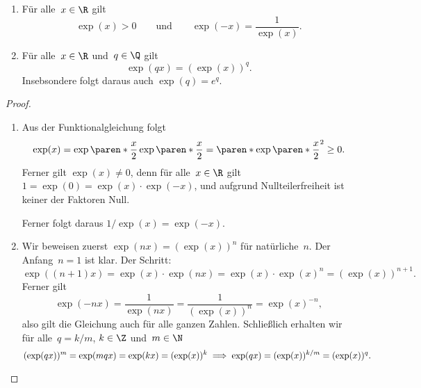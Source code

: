 \documentclass[a4paper]{article}
\begin{document}
\begin{corollary}\leavevmode
    \begin{enumerate}
        \item Für alle~$x \in \R$ gilt
              \begin{equation*}
                  \exp(x) > 0 \qquad\text{und}\qquad \exp(-x) = \frac{1}{\exp(x)}.
              \end{equation*}
        \item Für alle~$x \in \R$ und~$q \in \Q$ gilt
              \begin{equation*}
                  \exp(qx) = (\exp(x))^q.
              \end{equation*}
              Insebsondere folgt daraus auch $\exp(q) = e^q$.
    \end{enumerate}
\end{corollary}

\begin{proof}\leavevmode
    \begin{enumerate}
        \item Aus der Funktionalgleichung folgt
              \begin{equation*}
                  \exp(x) = \exp\paren*{\frac{x}{2}} \exp\paren*{\frac{x}{2}} = \paren*{\exp\paren*{\frac{x}{2}}}^2 \geq 0.
              \end{equation*}
              Ferner gilt $\exp(x) \neq 0$, denn für alle~$x \in \R$ gilt $1 = \exp(0) = \exp(x) \cdot \exp(-x)$, und aufgrund Nullteilerfreiheit ist keiner der Faktoren Null.

              Ferner folgt daraus $1/\exp(x) = \exp(-x)$.
        \item Wir beweisen zuerst $\exp(nx) = (\exp(x))^n$ für natürliche~$n$. Der Anfang~$n = 1$ ist klar. Der Schritt:
              \begin{equation*}
                  \exp((n+1)x) = \exp(x) \cdot \exp(nx) = \exp(x) \cdot \exp(x)^n = (\exp(x))^{n+1}.
              \end{equation*}
              Ferner gilt
              \begin{equation*}
                  \exp(-nx) = \frac{1}{\exp(nx)} = \frac{1}{(\exp(x))^n} = \exp(x)^{-n},
              \end{equation*}
              also gilt die Gleichung auch für alle ganzen Zahlen. Schließlich erhalten wir für alle~$q = k/m$, $k \in \Z$ und~$m \in \N$
              \begin{equation*}
                  (\exp(qx))^m = \exp(mqx) = \exp(kx) = (\exp(x))^k \implies \exp(qx) = (\exp(x))^{k/m} = (\exp(x))^q. \qedhere
              \end{equation*}
    \end{enumerate}
\end{proof}
\end{document}
